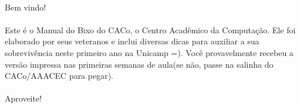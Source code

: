 \documentclass[a4paper,10pt, twocolumn, twoside]{article}
\begin{document}
\onecolumn

\paragraph{}
Bem vindo!

\paragraph{}
Este é o Manual do Bixo do CACo, o Centro Acadêmico da Computação.
Ele foi elaborado por seus veteranos e inclui diversas dicas para auxiliar a sua
sobrevivência neste primeiro ano na Unicamp =).
Você provavelmente recebeu a versão impressa nas primeiras semanas de aula(se
não, passe na salinha do CACo/AAACEC para pegar).

\paragraph{}
Aproveite!

\clearpage

\tableofcontents
\clearpage
\onecolumn



\clearpage

\onecolumn



\clearpage



\clearpage

\twocolumn






















\end{document}
